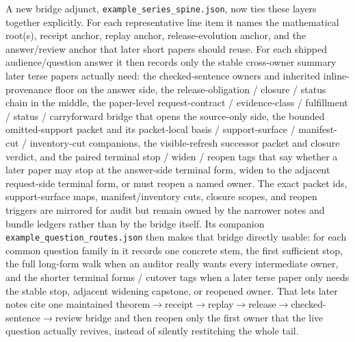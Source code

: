 \documentclass[11pt]{article}
\begin{document}
A new bridge adjunct, \texttt{example\_series\_spine.json}, now ties these layers together explicitly.
For each representative line item it names the mathematical root(s), receipt anchor, replay anchor, release-evolution anchor, and the answer/review anchor that later short papers should reuse.
For each shipped audience/question answer it then records only the stable cross-owner summary later terse papers actually need: the checked-sentence owners and inherited inline-provenance floor on the answer side, the release-obligation / closure / status chain in the middle, the paper-level request-contract / evidence-class / fulfillment / status / carryforward bridge that opens the source-only side, the bounded omitted-support packet and its packet-local basis / support-surface / manifest-cut / inventory-cut companions, the visible-refresh successor packet and closure verdict, and the paired terminal stop / widen / reopen tags that say whether a later paper may stop at the answer-side terminal form, widen to the adjacent request-side terminal form, or must reopen a named owner.
The exact packet ids, support-surface maps, manifest/inventory cuts, closure scopes, and reopen triggers are mirrored for audit but remain owned by the narrower notes and bundle ledgers rather than by the bridge itself.\cite{series:seriesspines,series:pairedterminalcitationdiscipline,series:pairedterminalcutoverrules}
Its companion \texttt{example\_question\_routes.json} then makes that bridge directly usable: for each common question family in  it records one concrete stem, the first sufficient stop, the full long-form walk when an auditor really wants every intermediate owner, and the shorter terminal forms / cutover tags when a later terse paper only needs the stable stop, adjacent widening capstone, or reopened owner.
That lets later notes cite one maintained theorem$\to$receipt$\to$replay$\to$release$\to$checked-sentence$\to$review bridge and then reopen only the first owner that the live question actually revives, instead of silently restitching the whole tail.\cite{series:seriesspines,series:pairedterminalcitationdiscipline,series:pairedterminalcutoverrules}
\end{document}
